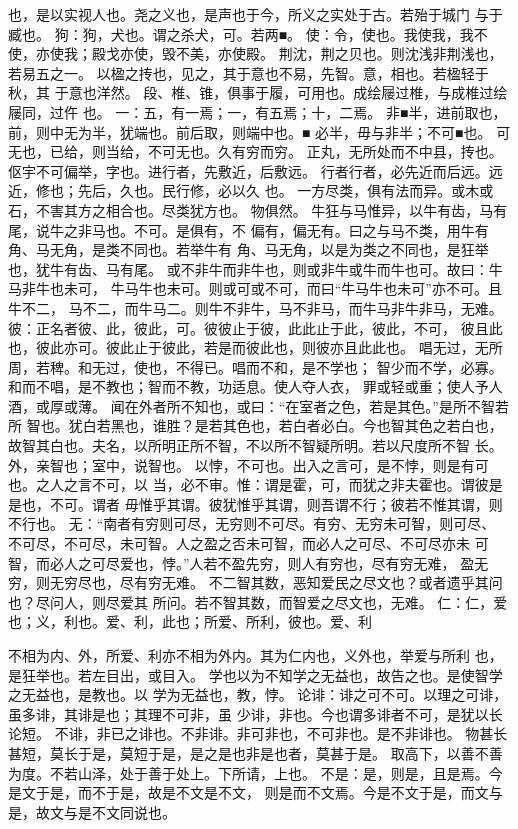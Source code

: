 \documentclass[12pt,UTF8]{ctexbook}
\begin{document}
也，是以实视人也。尧之义也，是声也于今，所义之实处于古。若殆于城门 
与于臧也。 
狗：狗，犬也。谓之杀犬，可。若两■。 
使：令，使也。我使我，我不使，亦使我；殿戈亦使，毁不美，亦使殿。 
荆沈，荆之贝也。则沈浅非荆浅也，若易五之一。 
以楹之抟也，见之，其于意也不易，先智。意，相也。若楹轻于秋，其 
于意也洋然。 
段、椎、锥，俱事于履，可用也。成绘屦过椎，与成椎过绘屦同，过仵 
也。 
一：五，有一焉；一，有五焉；十，二焉。 
非■半，进前取也，前，则中无为半，犹端也。前后取，则端中也。■ 
必半，毋与非半；不可■也。 
可无也，已给，则当给，不可无也。久有穷而穷。 
正丸，无所处而不中县，抟也。 
伛宇不可偏举，字也。进行者，先敷近，后敷远。 
行者行者，必先近而后远。远近，修也；先后，久也。民行修，必以久 
也。 
一方尽类，俱有法而异。或木或石，不害其方之相合也。尽类犹方也。 
物俱然。 
牛狂与马惟异，以牛有齿，马有尾，说牛之非马也。不可。是俱有，不 
偏有，偏无有。曰之与马不类，用牛有角、马无角，是类不同也。若举牛有 
角、马无角，以是为类之不同也，是狂举也，犹牛有齿、马有尾。 
或不非牛而非牛也，则或非牛或牛而牛也可。故曰：牛马非牛也未可， 
牛马牛也未可。则或可或不可，而曰“牛马牛也未可”亦不可。且牛不二， 
马不二，而牛马二。则牛不非牛，马不非马，而牛马非牛非马，无难。 
彼：正名者彼、此，彼此，可。彼彼止于彼，此此止于此，彼此，不可， 
彼且此也，彼此亦可。彼此止于彼此，若是而彼此也，则彼亦且此此也。 
唱无过，无所周，若稗。和无过，使也，不得已。唱而不和，是不学也； 
智少而不学，必寡。和而不唱，是不教也；智而不教，功适息。使人夺人衣， 
罪或轻或重；使人予人酒，或厚或薄。 
闻在外者所不知也，或曰：“在室者之色，若是其色。”是所不智若所 
智也。犹白若黑也，谁胜？是若其色也，若白者必白。今也智其色之若白也， 
故智其白也。夫名，以所明正所不智，不以所不智疑所明。若以尺度所不智 
长。外，亲智也；室中，说智也。 
以悖，不可也。出入之言可，是不悖，则是有可也。之人之言不可，以 
当，必不审。惟：谓是霍，可，而犹之非夫霍也。谓彼是是也，不可。谓者 
毋惟乎其谓。彼犹惟乎其谓，则吾谓不行；彼若不惟其谓，则不行也。 
无：“南者有穷则可尽，无穷则不可尽。有穷、无穷未可智，则可尽、 
不可尽，不可尽，未可智。人之盈之否未可智，而必人之可尽、不可尽亦未 
可智，而必人之可尽爱也，悖。”人若不盈先穷，则人有穷也，尽有穷无难， 
盈无穷，则无穷尽也，尽有穷无难。 
不二智其数，恶知爱民之尽文也？或者遗乎其问也？尽问人，则尽爱其 
所问。若不智其数，而智爱之尽文也，无难。 
仁：仁，爱也；义，利也。爱、利，此也；所爱、所利，彼也。爱、利 

不相为内、外，所爱、利亦不相为外内。其为仁内也，义外也，举爱与所利 
也，是狂举也。若左目出，或目入。 
学也以为不知学之无益也，故告之也。是使智学之无益也，是教也。以 
学为无益也，教，悖。 
论诽：诽之可不可。以理之可诽，虽多诽，其诽是也；其理不可非，虽 
少诽，非也。今也谓多诽者不可，是犹以长论短。 
不诽，非已之诽也。不非诽。非可非也，不可非也。是不非诽也。 
物甚长甚短，莫长于是，莫短于是，是之是也非是也者，莫甚于是。 
取高下，以善不善为度。不若山泽，处于善于处上。下所请，上也。 
不是：是，则是，且是焉。今是文于是，而不于是，故是不文是不文， 
则是而不文焉。今是不文于是，而文与是，故文与是不文同说也。 
\end{document}
